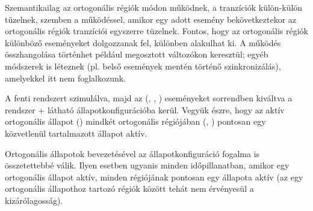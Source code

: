 Szemantikailag az ortogonális régiók  módon működnek, a tranzíciók külön-külön tüzelnek, szemben a  működéssel, amikor egy adott esemény bekövetkeztekor az ortogonális régiók tranzíciói egyszerre tüzelnek. Fontos, hogy az ortogonális régiók különböző eseményeket dolgozzanak fel, különben  alakulhat ki. A működés összhangolása történhet például megosztott változókon keresztül; egyéb módszerek is léteznek (pl. belső események mentén történő szinkronizálás), amelyekkel itt nem foglalkozunk.

\begin{pelda}
	A fenti rendszert szimulálva, majd az (, , ) eseményeket sorrendben kiváltva a rendszer \az+ látható állapotkonfigurációba kerül. Vegyük észre, hogy az aktív ortogonális állapot () mindkét ortogonális régiójában (, ) pontosan egy közvetlenül tartalmazott állapot aktív.
\end{pelda}


Ortogonális állapotok bevezetésével az állapotkonfiguráció fogalma is összetettebbé válik. Ilyen esetben ugyanis minden időpillanatban, amikor egy ortogonális állapot aktív, minden régiójának pontosan egy állapota aktív (az egy ortogonális állapothoz tartozó régiók között tehát nem érvényesül a kizárólagosság).


